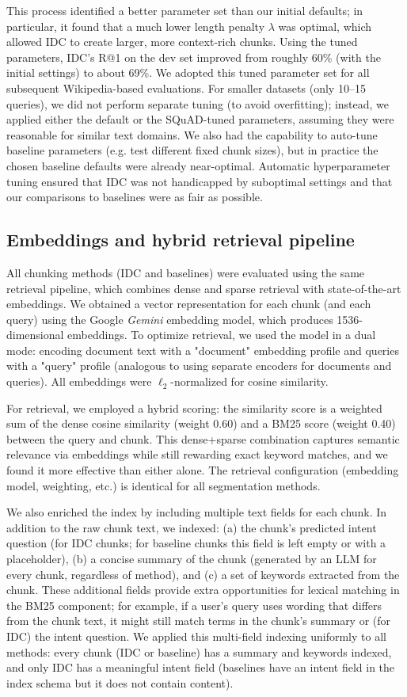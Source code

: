 \documentclass[12pt,a4paper]{report}
\begin{document}
This process identified a better parameter set than our initial defaults; in particular, it found that a much lower length penalty $\lambda$ was optimal, which allowed IDC to create larger, more context-rich chunks. Using the tuned parameters, IDC's R@1 on the dev set improved from roughly 60\% (with the initial settings) to about 69\%. We adopted this tuned parameter set for all subsequent Wikipedia-based evaluations. For smaller datasets (only 10--15 queries), we did not perform separate tuning (to avoid overfitting); instead, we applied either the default or the SQuAD-tuned parameters, assuming they were reasonable for similar text domains. We also had the capability to auto-tune baseline parameters (e.g. test different fixed chunk sizes), but in practice the chosen baseline defaults were already near-optimal. Automatic hyperparameter tuning ensured that IDC was not handicapped by suboptimal settings and that our comparisons to baselines were as fair as possible.

\subsection{Embeddings and hybrid retrieval pipeline}

All chunking methods (IDC and baselines) were evaluated using the same retrieval pipeline, which combines dense and sparse retrieval with state-of-the-art embeddings. We obtained a vector representation for each chunk (and each query) using the Google \textit{Gemini} embedding model, which produces 1536-dimensional embeddings. To optimize retrieval, we used the model in a dual mode: encoding document text with a "document" embedding profile and queries with a "query" profile (analogous to using separate encoders for documents and queries). All embeddings were $\ell_2$-normalized for cosine similarity. 

For retrieval, we employed a hybrid scoring: the similarity score is a weighted sum of the dense cosine similarity (weight 0.60) and a BM25 score (weight 0.40) between the query and chunk. This dense+sparse combination captures semantic relevance via embeddings while still rewarding exact keyword matches, and we found it more effective than either alone. The retrieval configuration (embedding model, weighting, etc.) is identical for all segmentation methods.

We also enriched the index by including multiple text fields for each chunk. In addition to the raw chunk text, we indexed: (a) the chunk's predicted intent question (for IDC chunks; for baseline chunks this field is left empty or with a placeholder), (b) a concise summary of the chunk (generated by an LLM for every chunk, regardless of method), and (c) a set of keywords extracted from the chunk. These additional fields provide extra opportunities for lexical matching in the BM25 component; for example, if a user's query uses wording that differs from the chunk text, it might still match terms in the chunk's summary or (for IDC) the intent question. We applied this multi-field indexing uniformly to all methods: every chunk (IDC or baseline) has a summary and keywords indexed, and only IDC has a meaningful intent field (baselines have an intent field in the index schema but it does not contain content). 
\end{document}
